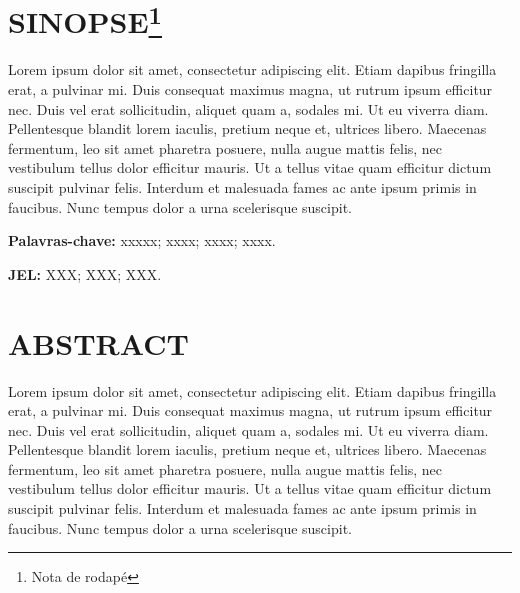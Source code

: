 \documentclass[
  12pt,
  a4paper,
]{td}
\begin{document}


\maketitle

\thispagestyle{fancy}

\ifdefined\Shaded\renewenvironment{Shaded}{\begin{tcolorbox}[sharp corners, frame hidden, boxrule=0pt, breakable, interior hidden, borderline west={3pt}{0pt}{shadecolor}, enhanced]}{\end{tcolorbox}}\fi


\hypertarget{sinopse}{%
\section*{\texorpdfstring{SINOPSE\footnote{Nota de rodapé}}{SINOPSE}}\label{sinopse}}

Lorem ipsum dolor sit amet, consectetur adipiscing elit. Etiam dapibus
fringilla erat, a pulvinar mi. Duis consequat maximus magna, ut rutrum
ipsum efficitur nec. Duis vel erat sollicitudin, aliquet quam a, sodales
mi. Ut eu viverra diam. Pellentesque blandit lorem iaculis, pretium
neque et, ultrices libero. Maecenas fermentum, leo sit amet pharetra
posuere, nulla augue mattis felis, nec vestibulum tellus dolor efficitur
mauris. Ut a tellus vitae quam efficitur dictum suscipit pulvinar felis.
Interdum et malesuada fames ac ante ipsum primis in faucibus. Nunc
tempus dolor a urna scelerisque suscipit.

\textbf{Palavras-chave:} xxxxx; xxxx; xxxx; xxxx.

\textbf{JEL:} XXX; XXX; XXX.

\hypertarget{abstract}{%
\section*{ABSTRACT}\label{abstract}}

Lorem ipsum dolor sit amet, consectetur adipiscing elit. Etiam dapibus
fringilla erat, a pulvinar mi. Duis consequat maximus magna, ut rutrum
ipsum efficitur nec. Duis vel erat sollicitudin, aliquet quam a, sodales
mi. Ut eu viverra diam. Pellentesque blandit lorem iaculis, pretium
neque et, ultrices libero. Maecenas fermentum, leo sit amet pharetra
posuere, nulla augue mattis felis, nec vestibulum tellus dolor efficitur
mauris. Ut a tellus vitae quam efficitur dictum suscipit pulvinar felis.
Interdum et malesuada fames ac ante ipsum primis in faucibus. Nunc
tempus dolor a urna scelerisque suscipit.
\end{document}
